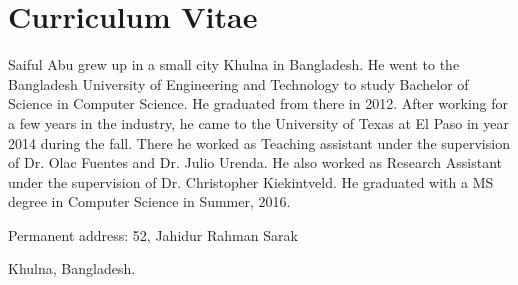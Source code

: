 
\chapter*{Curriculum Vitae}

Saiful Abu grew up in a small city Khulna in Bangladesh. He went to the Bangladesh University of Engineering and Technology to study Bachelor of Science in Computer Science. He graduated from there in 2012. After working for a few years in the industry, he came to the University of Texas at El Paso in year 2014 during the fall. There he worked as Teaching assistant under the supervision of Dr. Olac Fuentes and Dr. Julio Urenda. He also worked as Research Assistant under the supervision of Dr. Christopher Kiekintveld. He graduated with a MS degree in Computer Science in Summer, 2016. 



\medskip

\noindent
Permanent address: 52, Jahidur Rahman Sarak

\noindent
\hspace{1.42in}
Khulna, Bangladesh.

\vfill



